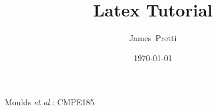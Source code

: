 \documentclass[12pt,journal,compsoc]{IEEEtran}
\begin{document}

\title{Latex Tutorial}
\author{James~Pretti}

\date{\today}		%

%
{Moulds \MakeLowercase{\textit{et al.}}: CMPE185}
% 

\end{document}
